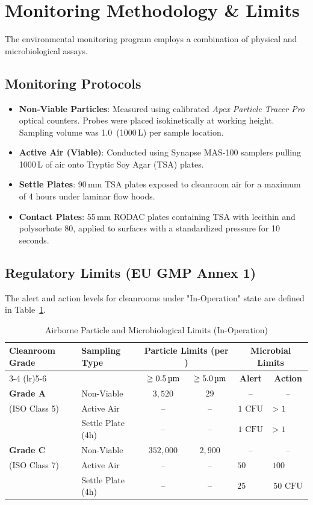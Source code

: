 \section{Monitoring Methodology \& Limits}
The environmental monitoring program employs a combination of physical and microbiological assays. 

\subsection{Monitoring Protocols}
\begin{itemize}
  \item \textbf{Non-Viable Particles}: Measured using calibrated \textit{Apex Particle Tracer Pro} optical counters. Probes were placed isokinetically at working height. Sampling volume was 1.0\,\mthree{} (1000\,L) per sample location.
  \item \textbf{Active Air (Viable)}: Conducted using Synapse MAS-100 samplers pulling 1000\,L of air onto Tryptic Soy Agar (TSA) plates.
  \item \textbf{Settle Plates}: 90\,mm TSA plates exposed to cleanroom air for a maximum of 4 hours under laminar flow hoods.
  \item \textbf{Contact Plates}: 55\,mm RODAC plates containing TSA with lecithin and polysorbate 80, applied to surfaces with a standardized pressure for 10 seconds.
\end{itemize}

\subsection{Regulatory Limits (EU GMP Annex 1)}
The alert and action levels for cleanrooms under "In-Operation" state are defined in Table~\ref{tab:regulatory_limits}.

\begin{table}[h]
\centering
\caption{Airborne Particle and Microbiological Limits (In-Operation)}
\label{tab:regulatory_limits}
\begin{tabularx}{\textwidth}{p{2cm} p{2cm} c c c c}
  \toprule
  \multirow{2}{*}{\textbf{Cleanroom Grade}} & \multirow{2}{*}{\textbf{Sampling Type}} & \multicolumn{2}{c}{\textbf{Particle Limits (per \mthree{})}} & \multicolumn{2}{c}{\textbf{Microbial Limits}} \\
  \cmidrule(lr){3-4} \cmidrule(lr){5-6}
  & & \(\ge 0.5\,\um\) & \(\ge 5.0\,\um\) & \textbf{Alert} & \textbf{Action} \\
  \midrule
  \textbf{Grade A} & Non-Viable & \(3,520\) & \(29\) & -- & -- \\
  (ISO Class 5) & Active Air & -- & -- & \(\text{1 CFU}\) & \(\text{> 1 CFU}\) \\
  & Settle Plate (4h) & -- & -- & \(\text{1 CFU}\) & \(\text{> 1 CFU}\) \\
  \midrule
  \textbf{Grade C} & Non-Viable & \(352,000\) & \(2,900\) & -- & -- \\
  (ISO Class 7) & Active Air & -- & -- & \(\text{50 CFU}\) & \(\text{100 CFU}\) \\
  & Settle Plate (4h) & -- & -- & \(\text{25 CFU}\) & \(\text{50 CFU}\) \\
  \bottomrule
\end{tabularx}
\end{table}

